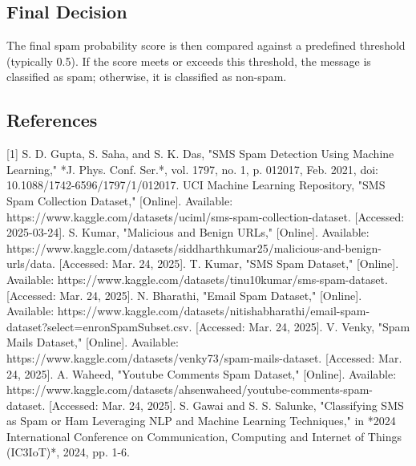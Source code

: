 \documentclass{article}
\begin{document}
\subsection{Final Decision}

The final spam probability score is then compared against a predefined threshold (typically 0.5). If the score meets or exceeds this threshold, the message is classified as spam; otherwise, it is classified as non-spam.




\newpage

\noindent


\subsection*{References}

[1] S. D. Gupta, S. Saha, and S. K. Das, "SMS Spam Detection Using Machine Learning," *J. Phys. Conf. Ser.*, vol. 1797, no. 1, p. 012017, Feb. 2021, doi: 10.1088/1742-6596/1797/1/012017.
\newline
\newline
[2] UCI Machine Learning Repository, "SMS Spam Collection Dataset," [Online]. Available: https://www.kaggle.com/datasets/uciml/sms-spam-collection-dataset. [Accessed: 2025-03-24].
\newline
\newline
[3] S. Kumar, "Malicious and Benign URLs," [Online]. Available: https://www.kaggle.com/datasets/siddharthkumar25/malicious-and-benign-urls/data. [Accessed: Mar. 24, 2025].
\newline
\newline
[4] T. Kumar, "SMS Spam Dataset," [Online]. Available: https://www.kaggle.com/datasets/tinu10kumar/sms-spam-dataset. [Accessed: Mar. 24, 2025].
\newline
\newline
[5] N. Bharathi, "Email Spam Dataset," [Online]. Available: https://www.kaggle.com/datasets/nitishabharathi/email-spam-dataset?select=enronSpamSubset.csv. [Accessed: Mar. 24, 2025].
\newline
\newline
[6] V. Venky, "Spam Mails Dataset," [Online]. Available: https://www.kaggle.com/datasets/venky73/spam-mails-dataset. [Accessed: Mar. 24, 2025].
\newline
\newline
[7] A. Waheed, "Youtube Comments Spam Dataset," [Online]. Available: https://www.kaggle.com/datasets/ahsenwaheed/youtube-comments-spam-dataset. [Accessed: Mar. 24, 2025].
\newline
\newline
[8] S. Gawai and S. S. Salunke, "Classifying SMS as Spam or Ham Leveraging NLP and Machine Learning Techniques," in *2024 International Conference on Communication, Computing and Internet of Things (IC3IoT)*, 2024, pp. 1-6.

\newpage
\end{document}
